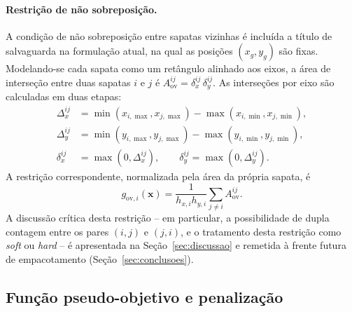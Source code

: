 \paragraph{Restrição de não sobreposição.}
A condição de não sobreposição entre sapatas vizinhas é incluída a título de salvaguarda na formulação atual, na qual as posições $(x_g, y_g)$ são fixas. Modelando-se cada sapata como um retângulo alinhado aos eixos, a área de interseção entre duas sapatas $i$ e $j$ é $A_{\mathrm{ov}}^{ij} = \delta_x^{ij}\,\delta_y^{ij}$. As interseções por eixo são calculadas em duas etapas:
\begin{equation}
    \begin{aligned}
    \Delta_x^{ij} &=
        \min(x_{i,\max}, x_{j,\max})
        - \max(x_{i,\min}, x_{j,\min}), \\
    \Delta_y^{ij} &=
        \min(y_{i,\max}, y_{j,\max})
        - \max(y_{i,\min}, y_{j,\min}), \\
    \delta_x^{ij} &= \max(0, \Delta_x^{ij}), \qquad
    \delta_y^{ij} = \max(0, \Delta_y^{ij}).
    \end{aligned}
    \label{eq:overlap}
\end{equation}
A restrição correspondente, normalizada pela área da própria sapata, é
\begin{equation}
    g_{\mathrm{ov},i}(\bm{x}) = \dfrac{1}{h_{x,i} h_{y,i}} \sum_{j \neq i} A_{\mathrm{ov}}^{ij}.
    \label{eq:g_overlap}
\end{equation}
A discussão crítica desta restrição -- em particular, a possibilidade de dupla contagem entre os pares $(i,j)$ e $(j,i)$, e o tratamento desta restrição como \textit{soft} ou \textit{hard} -- é apresentada na Seção~\ref{sec:discussao} e remetida à frente futura de empacotamento (Seção~\ref{sec:conclusoes}).

\subsection{Função pseudo-objetivo e penalização}
\label{sec:met_penalizacao}

